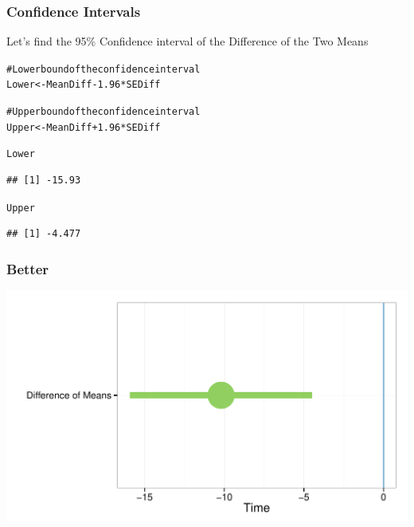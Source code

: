 \documentclass{beamer}\usepackage{graphicx, color}
\makeatletter
\def\maxwidth{ %
  \ifdim\Gin@nat@width>\linewidth
    \linewidth
  \else
    \Gin@nat@width
  \fi
}
\newcommand{\hlcomment}[1]{\textcolor[rgb]{0.180392156862745,0.6,0.341176470588235}{#1}}%
\newenvironment{kframe}{%
 \def\at@end@of@kframe{}%
 \ifinner\ifhmode%
  \def\at@end@of@kframe{\end{minipage}}%
  \begin{minipage}{\columnwidth}%
 \fi\fi%
 \def\FrameCommand##1{\hskip\@totalleftmargin \hskip-\fboxsep
 \colorbox{shadecolor}{##1}\hskip-\fboxsep
     \hskip-\linewidth \hskip-\@totalleftmargin \hskip\columnwidth}%
 \MakeFramed {\advance\hsize-\width
   \@totalleftmargin\z@ \linewidth\hsize
   \@setminipage}}%
 {\par\unskip\endMakeFramed%
 \at@end@of@kframe}
\newenvironment{knitrout}{}{} %
\makeatother
\begin{document}
\begin{frame}[fragile]
  \frametitle{Confidence Intervals}
{\Large{Let's find the 95\% Confidence interval of the Difference of the Two Means}}
\begin{knitrout}
\color{fgcolor}\begin{kframe}
\begin{alltt}
\hlcomment{# Lower bound of the confidence interval}
Lower <- MeanDiff - 1.96 * SEDiff

\hlcomment{# Upper bound of the confidence interval}
Upper <- MeanDiff + 1.96 * SEDiff

Lower
\end{alltt}
\begin{verbatim}
## [1] -15.93
\end{verbatim}
\begin{alltt}
Upper
\end{alltt}
\begin{verbatim}
## [1] -4.477
\end{verbatim}
\end{kframe}
\end{knitrout}

\end{frame}

\begin{frame}[fragile]
  \frametitle{Better}
\begin{knitrout}
\color{fgcolor}

{\centering \includegraphics[width=\maxwidth]{figure/PlotCIDiffMeans} 

}


\end{knitrout}

\end{frame}
\end{document}
